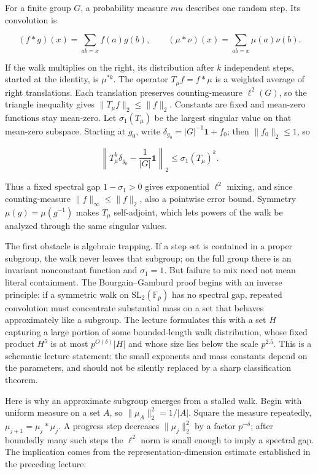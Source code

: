 For a finite group \(G\), a probability measure \(mu\) describes one random step. Its convolution is

\[ (f*g)(x)=\sum_{ab=x}f(a)g(b),\qquad (\mu*\nu)(x)=\sum_{ab=x}\mu(a)\nu(b). \]

If the walk multiplies on the right, its distribution after \(k\) independent steps, started at the identity, is \(\mu^{*k}\). The operator \(T_\mu f=f*\mu\) is a weighted average of right translations. Each translation preserves counting-measure \(\ell^2(G)\), so the triangle inequality gives \(\|T_\mu f\|_2\leq\|f\|_2\). Constants are fixed and mean-zero functions stay mean-zero. Let \(\sigma_1(T_\mu)\) be the largest singular value on that mean-zero subspace. Starting at \(g_0\), write \(\delta_{g_0}=|G|^{-1}\mathbf 1+f_0\); then \(\|f_0\|_2\leq1\), so

\[ \left\|T_\mu^k\delta_{g_0}-\frac{1}{|G|}\mathbf 1\right\|_2\leq \sigma_1(T_\mu)^k. \]

Thus a fixed spectral gap \(1-\sigma_1>0\) gives exponential \(\ell^2\) mixing, and since counting-measure \(\|f\|_\infty\leq\|f\|_2\), also a pointwise error bound. Symmetry \(\mu(g)=\mu(g^{-1})\) makes \(T_\mu\) self-adjoint, which lets powers of the walk be analyzed through the same singular values.

The first obstacle is algebraic trapping. If a step set is contained in a proper subgroup, the walk never leaves that subgroup; on the full group there is an invariant nonconstant function and \(\sigma_1=1\). But failure to mix need not mean literal containment. The Bourgain--Gamburd proof begins with an inverse principle: if a symmetric walk on \(\mathrm{SL}_2(\mathbb F_p)\) has no spectral gap, repeated convolution must concentrate substantial mass on a set that behaves approximately like a subgroup. The lecture formulates this with a set \(H\) capturing a large portion of some bounded-length walk distribution, whose fixed product \(H^5\) is at most \(p^{O(\delta)}|H|\) and whose size lies below the scale \(p^{2.5}\). This is a schematic lecture statement: the small exponents and mass constants depend on the parameters, and should not be silently replaced by a sharp classification theorem.

Here is why an approximate subgroup emerges from a stalled walk. Begin with uniform measure on a set \(A\), so \(\|\mu_A\|_2^2=1/|A|\). Square the measure repeatedly, \(\mu_{j+1}=\mu_j*\mu_j\). A progress step decreases \(\|\mu_j\|_2^2\) by a factor \(p^{-\delta}\); after boundedly many such steps the \(\ell^2\) norm is small enough to imply a spectral gap. The implication comes from the representation-dimension estimate established in the preceding lecture:

